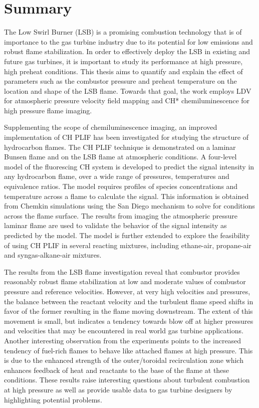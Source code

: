 \chapter*{Summary}

The Low Swirl Burner (LSB) is a promising combustion technology that is of importance to the gas turbine industry due to its potential for low  emissions and robust flame stabilization.
In order to effectively deploy the LSB in existing and future gas turbines, it is important to study its performance at high pressure, high preheat conditions.
This thesis aims to quantify and explain the effect of parameters such as the combustor pressure and preheat temperature on the location and shape of the LSB flame.
Towards that goal, the work employs LDV for atmospheric pressure velocity field mapping and CH* chemiluminescence for high pressure flame imaging.

Supplementing the scope of chemiluminescence imaging, an improved implementation of CH PLIF has been investigated for studying the structure of hydrocarbon flames.
The CH PLIF technique is demonstrated on a laminar Bunsen flame and on the LSB flame at atmospheric conditions.
A four-level model of the fluorescing CH system is developed to predict the signal intensity in any hydrocarbon flame, over a wide range of pressures, temperatures and equivalence ratios.
The model requires profiles of species concentrations and temperature across a flame to calculate the signal.
This information is obtained from Chemkin simulations using the San Diego mechanism to solve for conditions across the flame surface.
The results from imaging the atmospheric pressure laminar flame are used to validate the behavior of the signal intensity as predicted by the model.
The model is further extended to explore the feasibility of using CH PLIF in several reacting mixtures, including ethane-air, propane-air and syngas-alkane-air mixtures.

The results from the LSB flame investigation reveal that combustor provides reasonably robust flame stabilization at low and moderate values of combustor pressure and reference velocities.
However, at very high velocities and pressures, the balance between the reactant velocity and the turbulent flame speed shifts in favor of the former resulting in the flame moving downstream.
The extent of this movement is small, but indicates a tendency towards blow off at higher pressures and velocities that may be encountered in real world gas turbine applications.
Another interesting observation from the experiments points to the increased tendency of fuel-rich flames to behave like attached flames at high pressure.
This is due to the enhanced strength of the outer/toroidal recirculation zone which enhances feedback of heat and reactants to the base of the flame at these conditions.
These results raise interesting questions about turbulent combustion at high pressure as well as provide usable data to gas turbine designers by highlighting potential problems.

